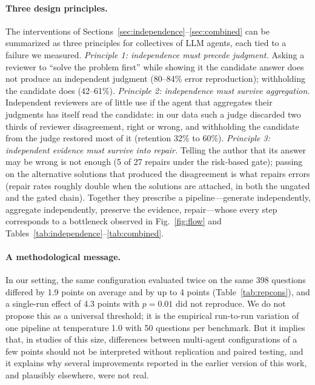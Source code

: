 \documentclass[manuscript, screen, review]{acmart}
\begin{document}
\paragraph{Three design principles.}
The interventions of Sections~\ref{sec:independence}--\ref{sec:combined} can be summarized as three principles for collectives of LLM agents, each tied to a failure we measured.
\emph{Principle 1: independence must precede judgment.} Asking a reviewer to ``solve the problem first'' while showing it the candidate answer does not produce an independent judgment (80--84\% error reproduction); withholding the candidate does (42--61\%).
\emph{Principle 2: independence must survive aggregation.} Independent reviewers are of little use if the agent that aggregates their judgments has itself read the candidate: in our data such a judge discarded two thirds of reviewer disagreement, right or wrong, and withholding the candidate from the judge restored most of it (retention 32\% to 60\%).
\emph{Principle 3: independent evidence must survive into repair.} Telling the author that its answer may be wrong is not enough (5 of 27 repairs under the risk-based gate); passing on the alternative solutions that produced the disagreement is what repairs errors (repair rates roughly double when the solutions are attached, in both the ungated and the gated chain).
Together they prescribe a pipeline---generate independently, aggregate independently, preserve the evidence, repair---whose every step corresponds to a bottleneck observed in Fig.~\ref{fig:flow} and Tables~\ref{tab:independence}--\ref{tab:combined}.

\paragraph{A methodological message.}
In our setting, the same configuration evaluated twice on the same 398 questions differed by 1.9 points on average and by up to 4 points (Table~\ref{tab:repcons}), and a single-run effect of 4.3 points with \(p=0.01\) did not reproduce.
We do not propose this as a universal threshold; it is the empirical run-to-run variation of one pipeline at temperature 1.0 with 50 questions per benchmark.
But it implies that, in studies of this size, differences between multi-agent configurations of a few points should not be interpreted without replication and paired testing, and it explains why several improvements reported in the earlier version of this work, and plausibly elsewhere, were not real.
\end{document}
